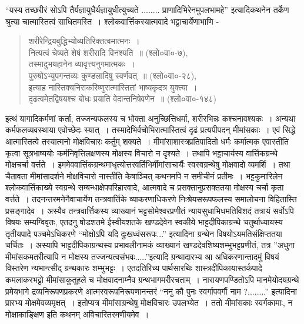 {“यस्य तच्छरीरं सोऽपि तैर्यज्ञायुधैर्यज्ञायुधीत्युच्यते ........ प्राणादिभिरेनमुपलभामहे” इत्यादिकथनेन तर्केण श्रुत्या चात्मास्तित्वं साधितमस्ति~। श्लोकवार्त्तिकस्यात्मवादे भट्टाचार्येणाभाणि - 
\begin{verse}
शरीरेन्द्रियबुद्धिभ्योव्यतिरिक्तत्वमात्मनः~। \\
नित्यत्वं चेष्यते शेषं शरीरादि विनश्यति~॥ (श्लो०वा०-७),\\
तस्मादुभयहानेन व्यावृत्त्यनुगमात्मकः~। \\
पुरुषोऽभ्युपगन्तव्यः कुण्डलादिषु स्वर्णवत्~॥ (श्लो०वा०-२८), \\
इत्याह नास्तिक्यनिराकरिष्णुरात्मास्तितां भाष्यकृदत्र युक्त्या~। \\ 
दृढत्वमेतद्विषयश्च बोधः प्रयाति वेदान्तनिषेवणेन~॥ (श्लो०वा०-१४८) 
\end{verse}
इत्थं यागादिकर्मणां कर्ता, तज्जन्यफलस्य च भोक्ता अनुच्छित्तिधर्मा, शरीरभिन्नः कश्चनावश्यकः~। अन्यथा कर्मफलव्यवस्थाया एवोच्छेदः स्यात्~। तस्मादेभिर्वचोभिरात्मास्तित्वं दृढं प्रत्यपीपदन् मीमांसकाः~। एवं सिद्धे आत्मास्तित्वे तस्यात्मनो मोक्षविचारः कर्तुम् शक्यते~। मीमांसाशास्त्रप्रतिपादितो धर्मः कर्मात्मक एवास्तीति कृत्वा सूत्रभाष्ययोः कर्मनिवृत्तिलक्षणस्य मोक्षस्य विचारो न दृश्यते~। तथापि भट्टाचार्यस्य वार्त्तिकग्रन्थे मोक्षचर्चा वर्त्तते~। इममेववार्त्तिकग्रन्थमाधृत्योत्तरवर्तिभिर्मीमांसाचार्यैः स्वस्वग्रन्थेषु मोक्षवादो व्यमर्शि~। तथा चैतावता मीमांसादर्शने मोक्षविचारो नास्तीति केेषाञ्चित् कथनमपि न समीचीनं प्रतीमः~। भट्टकुमारिलेन श्लोकवार्त्तिकाख्ये स्वग्रन्थे सम्बन्धाक्षेपपरिहारवादे, आत्मवादे च प्रसक्तानुप्रसक्ततया मोक्षस्य चर्चा कृता वर्त्तते~। 	तदनन्तरमनेनैवाचार्येण तन्त्रवार्त्तिके व्याकरणाधिकरणे निःश्रेयसरूपफलस्य समालोचना विहितास्ति प्रसङ्गादेव~। अस्यैव तन्त्रवार्त्तिकस्य व्याख्यानं भट्टसोमेश्वरप्रणीतं न्यायसुधाभिधमतिविशदं तत्रायं सर्वोऽपि विषयः सम्यग्विवृतः, एतदनु षोडशतमे ईस्वीयशतके खण्डदेवेन स्वकीये भाट्टदीपिकाग्रन्थे चतुर्थाध्यायस्य तृतीयपादे पञ्चमेऽधिकरणे “मोक्षोऽपि यदि दुःखध्वंसरूपः...” इत्यादिना ग्रन्थेन विषयोऽयमतिसंक्षिप्ततया चर्चितः~। अस्यापि भाट्टदीपिकाग्रन्थस्य प्रभावलीनामकं व्याख्यानं खण्डदेवशिष्यशम्भुभट्टप्रणीतं, तत्र ”अधुना मीमांसकमतरीत्यापि न मोक्षस्य तज्जन्यत्वसंभवः.....”इत्यादि ग्रन्थादारभ्य आ अधिकरणान्तादमुं विषयं विस्तरेण न्यभान्त्सीद् ग्रन्थकारः शम्भुभट्टः~। एतदतिरिच्य पार्थसारथिः शास्त्रदीपिकायास्तर्कपादे कमलाकरभट्टो  मीमांसाकुतूहले च मोक्षवादनाम्नैव ग्रन्थभागमरीरचताम्~। नारायणपण्डितोऽपि मानमेयोदयग्रन्थे प्रमेयभागे द्रव्यनिरूपणप्रकरणे आत्मस्वरूपनिरूपणानन्तरं “ननु कौ पुनः स्वर्गापवर्गौ नाम ?........” इत्यादिना प्रारभ्य मोक्षमेवव्यमृक्षत्~। इतोप्यत्र मीमांसाग्रन्थेषु मोक्षविचारः उपलभ्येत~। ततो मीमांसकाः स्वर्गकामाः, न मोक्षाकाङ्क्षिण इति कथनम् अविचारितरमणीयमेव~। 

}
